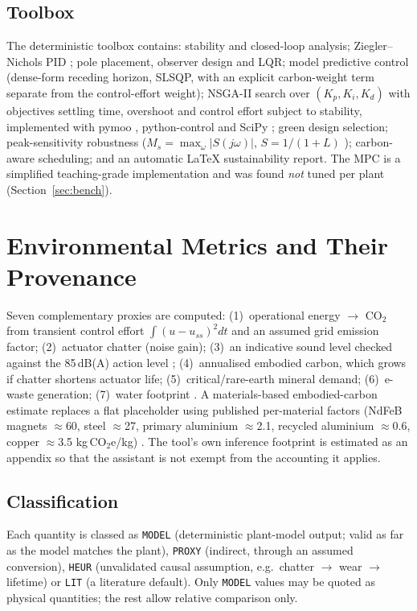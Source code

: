 \documentclass[a4paper,11pt]{article}
\begin{document}
\subsection{Toolbox}
The deterministic toolbox contains: stability and closed-loop analysis; Ziegler--Nichols PID \cite{zn}; pole placement, observer design and LQR; model predictive control (dense-form receding horizon, SLSQP, with an explicit carbon-weight term separate from the control-effort weight); NSGA-II search over $(K_p,K_i,K_d)$ with objectives settling time, overshoot and control effort subject to stability, implemented with pymoo \cite{pymoo}, python-control \cite{pythoncontrol} and SciPy \cite{scipy}; green design selection; peak-sensitivity robustness ($M_s=\max_\omega|S(j\omega)|$, $S=1/(1+L)$ \cite{astrommurray}); carbon-aware scheduling; and an automatic LaTeX sustainability report. The MPC is a simplified teaching-grade implementation and was found \emph{not} tuned per plant (Section~\ref{sec:bench}).

\section{Environmental Metrics and Their Provenance}\label{sec:prov}
Seven complementary proxies are computed: (1)~operational energy $\rightarrow$ CO$_2$ from transient control effort $\int(u-u_{ss})^2dt$ and an assumed grid emission factor; (2)~actuator chatter (noise gain); (3)~an indicative sound level checked against the 85\,dB(A) action level \cite{osha}; (4)~annualised embodied carbon, which grows if chatter shortens actuator life; (5)~critical/rare-earth mineral demand; (6)~e-waste generation; (7)~water footprint \cite{nrel,eia}. A materials-based embodied-carbon estimate replaces a flat placeholder using published per-material factors (NdFeB magnets $\approx$60, steel $\approx$27, primary aluminium $\approx$2.1, recycled aluminium $\approx$0.6, copper $\approx$3.5 kg\,CO$_2$e/kg) \cite{kuru,rotor,motorlca}. The tool's own inference footprint is estimated as an appendix \cite{google,altman,ritchie} so that the assistant is not exempt from the accounting it applies.

\subsection{Classification}
Each quantity is classed as \texttt{MODEL} (deterministic plant-model output; valid as far as the model matches the plant), \texttt{PROXY} (indirect, through an assumed conversion), \texttt{HEUR} (unvalidated causal assumption, e.g.\ chatter $\to$ wear $\to$ lifetime) or \texttt{LIT} (a literature default). Only \texttt{MODEL} values may be quoted as physical quantities; the rest allow relative comparison only.
\end{document}
